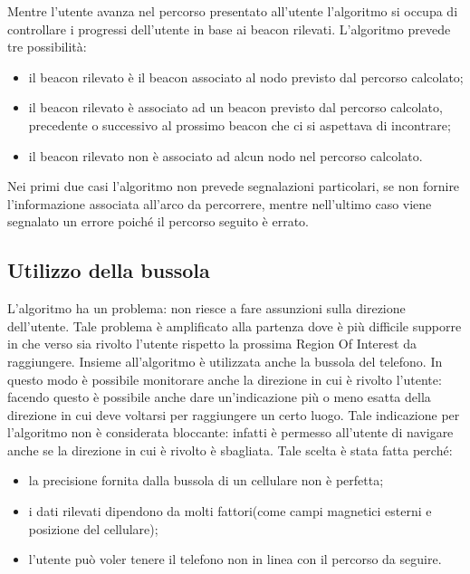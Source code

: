 \documentclass[../SperimentazioniPratiche.tex]{subfiles}
\begin{document}
		Mentre l'utente avanza nel percorso presentato all'utente l'algoritmo si occupa di controllare i progressi dell'utente in base ai beacon rilevati. L'algoritmo prevede tre possibilità:
		\begin{itemize}
			\item il beacon rilevato è il beacon associato al nodo previsto dal percorso calcolato;
			\item il beacon rilevato è associato ad un beacon previsto dal percorso calcolato, precedente o successivo al prossimo beacon che ci si aspettava di incontrare;
			\item il beacon rilevato non è associato ad alcun nodo nel percorso calcolato.
		\end{itemize}
		Nei primi due casi l'algoritmo non prevede segnalazioni particolari, se non fornire l'informazione associata all'arco da percorrere, mentre nell'ultimo caso viene segnalato un errore poiché il percorso seguito è errato.

	\subsection{Utilizzo della bussola}
		L'algoritmo ha un problema: non riesce a fare assunzioni sulla direzione dell'utente. Tale problema è amplificato alla partenza dove è più difficile supporre in che verso sia rivolto l'utente rispetto la prossima Region Of Interest da raggiungere. Insieme all'algoritmo è utilizzata anche la bussola del telefono. In questo modo è possibile monitorare anche la direzione in cui è rivolto l'utente: facendo questo è possibile anche dare un'indicazione più o meno esatta della direzione in cui deve voltarsi per raggiungere un certo luogo. Tale indicazione per l'algoritmo non è considerata bloccante: infatti è permesso all'utente di navigare anche se la direzione in cui è rivolto è sbagliata. Tale scelta è stata fatta perché:
		\begin{itemize}
			\item la precisione fornita dalla bussola di un cellulare non è perfetta;
			\item i dati rilevati dipendono da molti fattori(come campi magnetici esterni e posizione del cellulare);
			\item l'utente può voler tenere il telefono non in linea con il percorso da seguire.
		\end{itemize}
		
\end{document}
